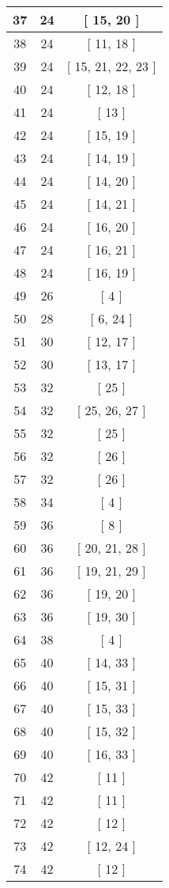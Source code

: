 \begin{center}
\begin{longtable}[H]{|| c c c ||}
37 & 24 & [ 15, 20 ]
\\\hline
38 & 24 & [ 11, 18 ]
\\\hline
39 & 24 & [ 15, 21, 22, 23 ]
\\\hline
40 & 24 & [ 12, 18 ]
\\\hline
41 & 24 & [ 13 ]
\\\hline
42 & 24 & [ 15, 19 ]
\\\hline
43 & 24 & [ 14, 19 ]
\\\hline
44 & 24 & [ 14, 20 ]
\\\hline
45 & 24 & [ 14, 21 ]
\\\hline
46 & 24 & [ 16, 20 ]
\\\hline
47 & 24 & [ 16, 21 ]
\\\hline
48 & 24 & [ 16, 19 ]
\\\hline
49 & 26 & [ 4 ]
\\\hline
50 & 28 & [ 6, 24 ]
\\\hline
51 & 30 & [ 12, 17 ]
\\\hline
52 & 30 & [ 13, 17 ]
\\\hline
53 & 32 & [ 25 ]
\\\hline
54 & 32 & [ 25, 26, 27 ]
\\\hline
55 & 32 & [ 25 ]
\\\hline
56 & 32 & [ 26 ]
\\\hline
57 & 32 & [ 26 ]
\\\hline
58 & 34 & [ 4 ]
\\\hline
59 & 36 & [ 8 ]
\\\hline
60 & 36 & [ 20, 21, 28 ]
\\\hline
61 & 36 & [ 19, 21, 29 ]
\\\hline
62 & 36 & [ 19, 20 ]
\\\hline
63 & 36 & [ 19, 30 ]
\\\hline
64 & 38 & [ 4 ]
\\\hline
65 & 40 & [ 14, 33 ]
\\\hline
66 & 40 & [ 15, 31 ]
\\\hline
67 & 40 & [ 15, 33 ]
\\\hline
68 & 40 & [ 15, 32 ]
\\\hline
69 & 40 & [ 16, 33 ]
\\\hline
70 & 42 & [ 11 ]
\\\hline
71 & 42 & [ 11 ]
\\\hline
72 & 42 & [ 12 ]
\\\hline
73 & 42 & [ 12, 24 ]
\\\hline
74 & 42 & [ 12 ]
\\\hline

\end{longtable}
\end{center}
